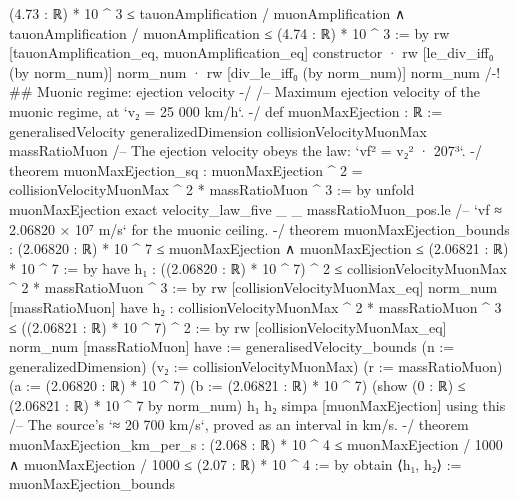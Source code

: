 \documentclass[11pt,a4paper]{article}
\begin{document}
{    (4.73 : ℝ) * 10 \textasciicircum{} 3 ≤ tauonAmplification / muonAmplification ∧
      tauonAmplification / muonAmplification ≤ (4.74 : ℝ) * 10 \textasciicircum{} 3 := by
  rw [tauonAmplification\_\allowbreak{}eq, muonAmplification\_\allowbreak{}eq]
  constructor
  · rw [le\_\allowbreak{}div\_\allowbreak{}iff₀ (by norm\_\allowbreak{}num)]
    norm\_\allowbreak{}num
  · rw [div\_\allowbreak{}le\_\allowbreak{}iff₀ (by norm\_\allowbreak{}num)]
    norm\_\allowbreak{}num
\mbox{}
/-! \#\# Muonic regime: ejection velocity -/
\mbox{}
/-- Maximum ejection velocity of the muonic regime, at `v₂ = 25 000 km/h`. -/
def muonMaxEjection : ℝ :=
  generalisedVelocity generalizedDimension collisionVelocityMuonMax massRatioMuon
\mbox{}
/-- The ejection velocity obeys the law: `vf² = v₂² · 207³`. -/
theorem muonMaxEjection\_\allowbreak{}sq :
    muonMaxEjection \textasciicircum{} 2 = collisionVelocityMuonMax \textasciicircum{} 2 * massRatioMuon \textasciicircum{} 3 := by
  unfold muonMaxEjection
  exact velocity\_\allowbreak{}law\_\allowbreak{}five \_\allowbreak{} \_\allowbreak{} massRatioMuon\_\allowbreak{}pos.le
\mbox{}
/-- `vf ≈ 2.06820 × 10⁷ m/s` for the muonic ceiling. -/
theorem muonMaxEjection\_\allowbreak{}bounds :
    (2.06820 : ℝ) * 10 \textasciicircum{} 7 ≤ muonMaxEjection ∧
      muonMaxEjection ≤ (2.06821 : ℝ) * 10 \textasciicircum{} 7 := by
  have h₁ : ((2.06820 : ℝ) * 10 \textasciicircum{} 7) \textasciicircum{} 2 ≤
      collisionVelocityMuonMax \textasciicircum{} 2 * massRatioMuon \textasciicircum{} 3 := by
    rw [collisionVelocityMuonMax\_\allowbreak{}eq]
    norm\_\allowbreak{}num [massRatioMuon]
  have h₂ : collisionVelocityMuonMax \textasciicircum{} 2 * massRatioMuon \textasciicircum{} 3 ≤
      ((2.06821 : ℝ) * 10 \textasciicircum{} 7) \textasciicircum{} 2 := by
    rw [collisionVelocityMuonMax\_\allowbreak{}eq]
    norm\_\allowbreak{}num [massRatioMuon]
  have := generalisedVelocity\_\allowbreak{}bounds (n := generalizedDimension)
    (v₂ := collisionVelocityMuonMax) (r := massRatioMuon)
    (a := (2.06820 : ℝ) * 10 \textasciicircum{} 7) (b := (2.06821 : ℝ) * 10 \textasciicircum{} 7)
    (show (0 : ℝ) ≤ (2.06821 : ℝ) * 10 \textasciicircum{} 7 by norm\_\allowbreak{}num) h₁ h₂
  simpa [muonMaxEjection] using this
\mbox{}
/-- The source's `≈ 20 700 km/s`, proved as an interval in km/s. -/
theorem muonMaxEjection\_\allowbreak{}km\_\allowbreak{}per\_\allowbreak{}s :
    (2.068 : ℝ) * 10 \textasciicircum{} 4 ≤ muonMaxEjection / 1000 ∧
      muonMaxEjection / 1000 ≤ (2.07 : ℝ) * 10 \textasciicircum{} 4 := by
  obtain ⟨h₁, h₂⟩ := muonMaxEjection\_\allowbreak{}bounds
}
\end{document}
